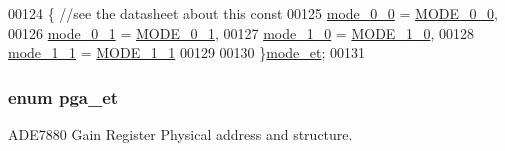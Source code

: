 \begin{DoxyCode}
00124 \{  \textcolor{comment}{//see the datasheet about this const}
00125    \hyperlink{a00036_a2f9fad1776ad62bb8d7627582ecf8fd5a1dee68c44c7100156916a6f1924dfe1d}{mode\_0\_0} = \hyperlink{a00036_ab25bd124940aca39914f363b92cabb95}{MODE\_0\_0},       
00126    \hyperlink{a00036_a2f9fad1776ad62bb8d7627582ecf8fd5a6902084e9f2215f3ad655232a365fa94}{mode\_0\_1} = \hyperlink{a00036_aa4b4d2ec825ed4a85181717901110ff7}{MODE\_0\_1},   
00127    \hyperlink{a00036_a2f9fad1776ad62bb8d7627582ecf8fd5a94d8576ca2db3e13b94dfaf4ff333c86}{mode\_1\_0} = \hyperlink{a00036_a2f363ec07f38ba94cc1d74172233d801}{MODE\_1\_0}, 
00128    \hyperlink{a00036_a2f9fad1776ad62bb8d7627582ecf8fd5ac640d7e945220b2b6b82511956da6e37}{mode\_1\_1} = \hyperlink{a00036_abfccf6bbc27bb259fc6233bc9ee591e2}{MODE\_1\_1}
00129   
00130 \}\hyperlink{a00036_a2f9fad1776ad62bb8d7627582ecf8fd5}{mode\_et};
00131   
\end{DoxyCode}
\hypertarget{a00036_ad9e71b7c5a4b7598dfea38b40734d96f}{
\subsubsection[{pga\-\_\-et}]{\setlength{\rightskip}{0pt plus 5cm}enum {\bf pga\-\_\-et}}}\label{de/d8c/a00036_ad9e71b7c5a4b7598dfea38b40734d96f}


A\-D\-E7880 Gain Register Physical address and structure. 

